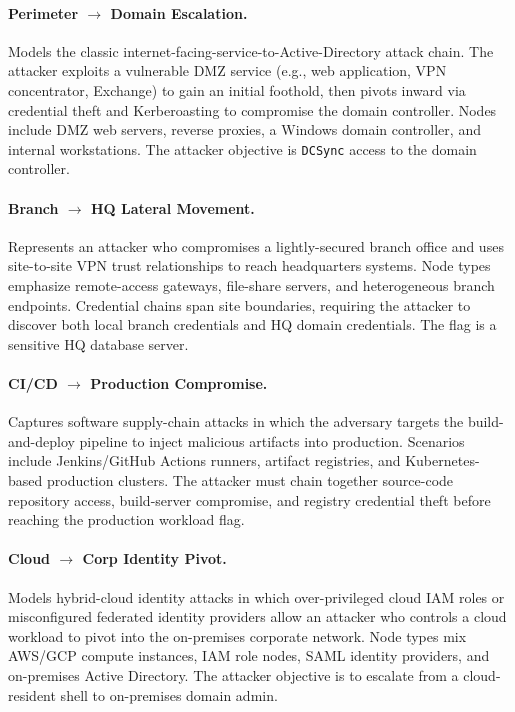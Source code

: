 \documentclass[11pt,a4paper]{article}
\begin{document}
\paragraph{Perimeter $\to$ Domain Escalation.}
Models the classic internet-facing-service-to-Active-Directory attack chain.
The attacker exploits a vulnerable DMZ service (e.g., web application, VPN
concentrator, Exchange) to gain an initial foothold, then pivots inward via
credential theft and Kerberoasting to compromise the domain controller.
Nodes include DMZ web servers, reverse proxies, a Windows domain controller,
and internal workstations.  The attacker objective is \texttt{DCSync} access
to the domain controller.

\paragraph{Branch $\to$ HQ Lateral Movement.}
Represents an attacker who compromises a lightly-secured branch office and
uses site-to-site VPN trust relationships to reach headquarters systems.
Node types emphasize remote-access gateways, file-share servers, and
heterogeneous branch endpoints.  Credential chains span site boundaries,
requiring the attacker to discover both local branch credentials and HQ
domain credentials.  The flag is a sensitive HQ database server.

\paragraph{CI/CD $\to$ Production Compromise.}
Captures software supply-chain attacks in which the adversary targets the
build-and-deploy pipeline to inject malicious artifacts into production.
Scenarios include Jenkins/GitHub Actions runners, artifact registries, and
Kubernetes-based production clusters.  The attacker must chain together
source-code repository access, build-server compromise, and registry
credential theft before reaching the production workload flag.

\paragraph{Cloud $\to$ Corp Identity Pivot.}
Models hybrid-cloud identity attacks in which over-privileged cloud IAM
roles or misconfigured federated identity providers allow an attacker who
controls a cloud workload to pivot into the on-premises corporate network.
Node types mix AWS/GCP compute instances, IAM role nodes, SAML identity
providers, and on-premises Active Directory.  The attacker objective is to
escalate from a cloud-resident shell to on-premises domain admin.
\end{document}
